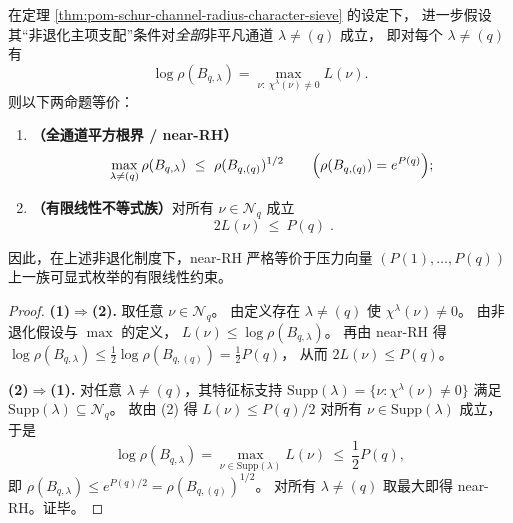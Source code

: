 \begin{theorem}\label{thm:pom-schur-near-rh-linear-inequality-complete}
在定理 \ref{thm:pom-schur-channel-radius-character-sieve} 的设定下，
进一步假设其“非退化主项支配”条件对\emph{全部}非平凡通道 \(\lambda\neq(q)\) 成立，
即对每个 \(\lambda\neq(q)\) 有
\[
\log\rho(B_{q,\lambda})=\max_{\nu:\ \chi^\lambda(\nu)\neq0} L(\nu).
\]
则以下两命题等价：
\begin{enumerate}
  \item \textbf{（全通道平方根界 / near-RH）}
  \[
  \max_{\lambda\neq(q)}\rho(B_{q,\lambda})\ \le\ \rho(B_{q,(q)})^{1/2}
  \qquad\Bigl(\rho(B_{q,(q)})=e^{P(q)}\Bigr);
  \]
  \item \textbf{（有限线性不等式族）}对所有 \(\nu\in\mathcal{N}_q\) 成立
  \[
  \boxed{\;2L(\nu)\ \le\ P(q)\; }.
  \]
\end{enumerate}
因此，在上述非退化制度下，near-RH 严格等价于压力向量 \((P(1),\dots,P(q))\) 上一族可显式枚举的有限线性约束。
\end{theorem}
\begin{proof}
\textbf{(1)\(\Rightarrow\)(2).}
取任意 \(\nu\in\mathcal{N}_q\)。
由定义存在 \(\lambda\neq(q)\) 使 \(\chi^\lambda(\nu)\neq0\)。
由非退化假设与 \(\max\) 的定义，
\(
L(\nu)\le \log\rho(B_{q,\lambda})
\)。
再由 near-RH 得 \(\log\rho(B_{q,\lambda})\le \frac12\log\rho(B_{q,(q)})=\frac12P(q)\)，
从而 \(2L(\nu)\le P(q)\)。
\par
\textbf{(2)\(\Rightarrow\)(1).}
对任意 \(\lambda\neq(q)\)，其特征标支持
\(
\mathrm{Supp}(\lambda)=\{\nu:\chi^\lambda(\nu)\neq0\}
\)
满足 \(\mathrm{Supp}(\lambda)\subseteq\mathcal{N}_q\)。
故由 (2) 得 \(L(\nu)\le P(q)/2\) 对所有 \(\nu\in\mathrm{Supp}(\lambda)\) 成立，
于是
\[
\log\rho(B_{q,\lambda})
=\max_{\nu\in\mathrm{Supp}(\lambda)} L(\nu)\ \le\ \frac12P(q),
\]
即 \(\rho(B_{q,\lambda})\le e^{P(q)/2}=\rho(B_{q,(q)})^{1/2}\)。
对所有 \(\lambda\neq(q)\) 取最大即得 near-RH。证毕。
\end{proof}

